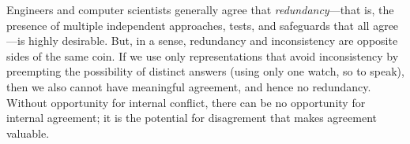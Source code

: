 Engineers and computer scientists 
generally agree that \emph{redundancy}---that is, the presence of multiple independent approaches, tests, and safeguards that all agree---is highly desirable. 
But, in a sense, redundancy and inconsistency are opposite sides of the same coin. 
If we use only representations that avoid inconsistency 
    by preempting the possibility of distinct answers
    (using only one watch, so to speak),
    then we also cannot have meaningful agreement, 
        and hence no redundancy. 
Without opportunity for internal conflict, there can be no opportunity for internal agreement; 
it is the 
potential for
disagrement that makes agreement valuable. 



